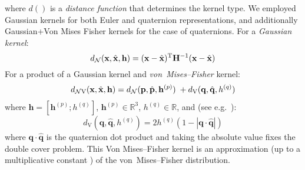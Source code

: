 \noindent where $d()$ is a \textit{distance function} that determines the kernel type. We employed Gaussian kernels for both Euler and quaternion representations, and additionally Gaussian+Von Mises Fisher kernels for the case of quaternions. For a \textit{Gaussian kernel}:
\begin{equation}
d_\mathrm{\mathcal{N}}(\bx, \hat{\bx}, \mathbf{h}) =
(\bx - \hat{\bx})^\mathrm{T}\mathbf{H}^{-1}(\bx - \hat{\bx})
\label{eq:Density.Estimation.gaussiandist}
\end{equation}
For a product of a Gaussian kernel and \textit{von~Mises--Fisher} kernel:
\begin{multline}
d_\mathrm{\mathcal{N}V}(\bx, \hat{\bx}, \mathbf{h}) =
d_\mathrm{\mathcal{N}}(\mathbf{p}, \hat{\mathbf{p}}, \mathbf{h}^{(p)}) \; + d_\mathrm{V}(\mathbf{q}, \hat{\mathbf{q}}, h^{(q)})
\label{eq:Density.Estimation.gaussvmfdist}
\end{multline}
\noindent where %
$\mathbf{h} = \left[ \mathbf{h}^{(p)} ; h^{(q)} \right]$,
$\mathbf{h}^{(p)} \in \mathbb{R}^3$,
$h^{(q)} \in \mathbb{R}$,
and (see e.g.\ \cite{abramowitz_handbook_1965}):
\begin{equation}
d_\mathrm{V}(\mathbf{q}, \hat{\mathbf{q}}, h^{(q)}) =
2 h^{(q)} \left(1 - \left| \mathbf{q} \cdot \hat{\mathbf{q}} \right|\right)
\label{eq:Density.Estimation.vmfdist}
\end{equation}
\noindent where $\mathbf{q} \cdot \hat{\mathbf{q}}$ is the quaternion dot product and taking the absolute value fixes the double cover problem. This Von Mises--Fisher kernel is an approximation (up to a multiplicative constant \cite{detry_learning_2010}) of the von~Mises--Fisher distribution.

